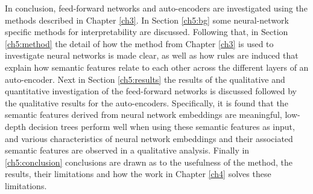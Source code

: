 
In conclusion, feed-forward networks and auto-encoders are investigated using the methods described in Chapter \ref{ch3}. In Section \ref{ch5:bg} some neural-network specific methods for interpretability are discussed. Following that, in Section \ref{ch5:method} the detail of how the method from Chapter \ref{ch3} is used to investigate neural networks is made clear, as well as how rules are induced that explain how semantic features relate to each other across the different layers of an auto-encoder. Next in Section \ref{ch5:results} the results of the qualitative and quantitative investigation of the feed-forward networks is discussed followed by the qualitative results for the auto-encoders. Specifically, it is found that the semantic features derived from neural network embeddings are meaningful, low-depth decision trees perform well when using these semantic features as input, and various characteristics of neural network embeddings and their associated semantic features are observed in a qualitative analysis.  Finally in \ref{ch5:conclusion} conclusions are drawn as to the usefulness of the method, the results, their limitations and how the work in Chapter \ref{ch4} solves  these limitations. %







